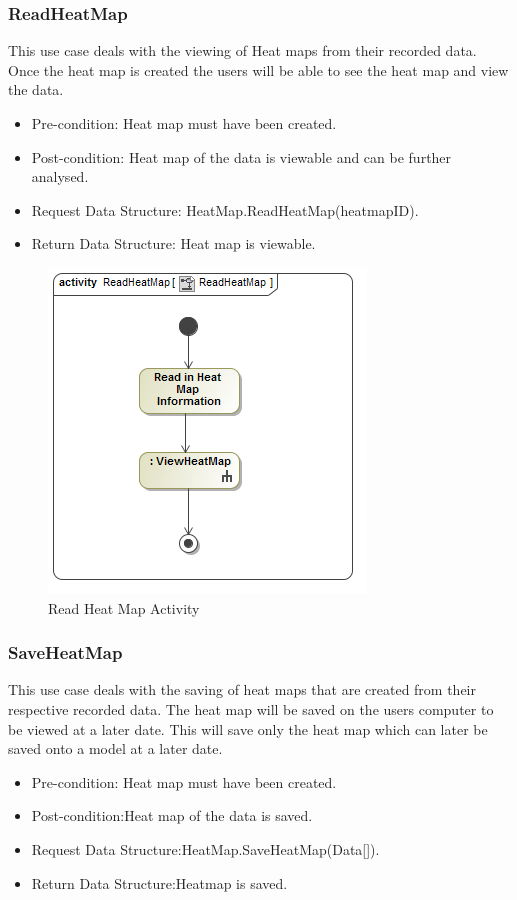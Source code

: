 	\subsubsection{ReadHeatMap}
	This use case deals with the viewing of Heat maps from their recorded data. Once the heat map is created the users will be able to see the heat map and view the data.
	\begin{itemize}
		\item Pre-condition: Heat map must have been created.
		\item Post-condition: Heat map of the data is viewable and can be further analysed.
		\item Request Data Structure: HeatMap.ReadHeatMap(heatmapID).
		\item Return Data Structure: Heat map is viewable.
	\end{itemize}
	
	\begin{figure}[!ht]
		\centering
		\includegraphics[scale=0.5]{Diagrams/Activity_Diagram__ReadHeatMap__ReadHeatMap.png}
		\caption{Read Heat Map Activity}
	\end{figure}
	
	\subsubsection{SaveHeatMap}
	This use case deals with the saving of heat maps that are created from their respective recorded data. The heat map will be saved on the users computer to be viewed at a later date. This will save only the heat map which can later be saved onto a model at a later date.
	\begin{itemize}
		\item Pre-condition: Heat map must have been created.
		\item Post-condition:Heat map of the data is saved.
		\item Request Data Structure:HeatMap.SaveHeatMap(Data[]).
		\item Return Data Structure:Heatmap is saved.
	\end{itemize}
	
